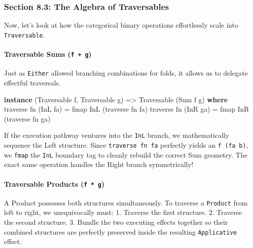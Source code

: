 \documentclass[
]{article}
\newenvironment{Shaded}{}{}
\newcommand{\DataTypeTok}[1]{\textcolor[rgb]{0.56,0.13,0.00}{#1}}
\newcommand{\FunctionTok}[1]{\textcolor[rgb]{0.02,0.16,0.49}{#1}}
\newcommand{\KeywordTok}[1]{\textcolor[rgb]{0.00,0.44,0.13}{\textbf{#1}}}
\newcommand{\NormalTok}[1]{#1}
\newcommand{\OtherTok}[1]{\textcolor[rgb]{0.00,0.44,0.13}{#1}}
\begin{document}
\subsubsection{Section 8.3: The Algebra of
Traversables}\label{section-8.3-the-algebra-of-traversables}

Now, let's look at how the categorical binary operations effortlessly
scale into \texttt{Traversable}.

\paragraph{\texorpdfstring{Traversable Sums
(\texttt{f\ +\ g})}{Traversable Sums (f + g)}}\label{traversable-sums-f-g}

Just as \texttt{Either} allowed branching combinations for folds, it
allows us to delegate effectful traversals.

\begin{Shaded}
\begin{Highlighting}[]
\KeywordTok{instance}\NormalTok{ (}\DataTypeTok{Traversable}\NormalTok{ f, }\DataTypeTok{Traversable}\NormalTok{ g) }\OtherTok{=\textgreater{}} \DataTypeTok{Traversable}\NormalTok{ (}\DataTypeTok{Sum}\NormalTok{ f g) }\KeywordTok{where}
    \FunctionTok{traverse}\NormalTok{ fn (}\DataTypeTok{InL}\NormalTok{ fa) }\OtherTok{=} \FunctionTok{fmap} \DataTypeTok{InL}\NormalTok{ (}\FunctionTok{traverse}\NormalTok{ fn fa)}
    \FunctionTok{traverse}\NormalTok{ fn (}\DataTypeTok{InR}\NormalTok{ ga) }\OtherTok{=} \FunctionTok{fmap} \DataTypeTok{InR}\NormalTok{ (}\FunctionTok{traverse}\NormalTok{ fn ga)}
\end{Highlighting}
\end{Shaded}

If the execution pathway ventures into the \texttt{InL} branch, we
mathematically sequence the Left structure. Since
\texttt{traverse\ fn\ fa} perfectly yields an \texttt{f\ (fa\ b)}, we
\texttt{fmap} the \texttt{InL} boundary tag to cleanly rebuild the
correct Sum geometry. The exact same operation handles the Right branch
symmetrically!

\paragraph{\texorpdfstring{Traversable Products
(\texttt{f\ *\ g})}{Traversable Products (f * g)}}\label{traversable-products-f-g}

A Product possesses both structures simultaneously. To traverse a
\texttt{Product} from left to right, we unequivocally must: 1. Traverse
the first structure. 2. Traverse the second structure. 3. Bundle the two
executing effects together so their combined structures are perfectly
preserved inside the resulting \texttt{Applicative} effect.
\end{document}
